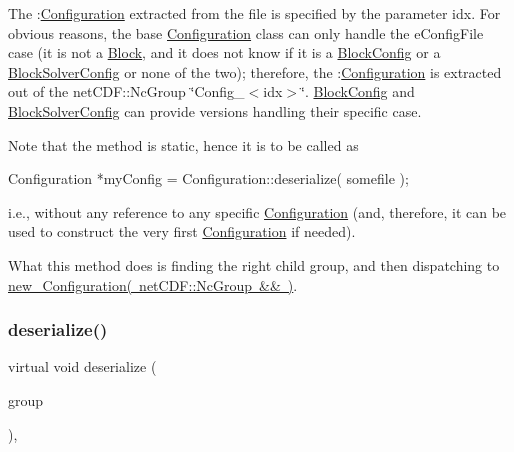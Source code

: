 The \+:\mbox{\hyperlink{class_s_m_spp__di__unipi__it_1_1_configuration}{Configuration}} extracted from the file is specified by the parameter idx. For obvious reasons, the base \mbox{\hyperlink{class_s_m_spp__di__unipi__it_1_1_configuration}{Configuration}} class can only handle the e\+Config\+File case (it is not a \mbox{\hyperlink{class_s_m_spp__di__unipi__it_1_1_block}{Block}}, and it does not know if it is a \mbox{\hyperlink{class_s_m_spp__di__unipi__it_1_1_block_config}{Block\+Config}} or a \mbox{\hyperlink{class_s_m_spp__di__unipi__it_1_1_block_solver_config}{Block\+Solver\+Config}} or none of the two); therefore, the \+:\mbox{\hyperlink{class_s_m_spp__di__unipi__it_1_1_configuration}{Configuration}} is extracted out of the net\+C\+D\+F\+::\+Nc\+Group \char`\"{}\+Config\+\_\+$<$idx$>$\char`\"{}. \mbox{\hyperlink{class_s_m_spp__di__unipi__it_1_1_block_config}{Block\+Config}} and \mbox{\hyperlink{class_s_m_spp__di__unipi__it_1_1_block_solver_config}{Block\+Solver\+Config}} can provide versions handling their specific case.

Note that the method is static, hence it is to be called as \begin{DoxyVerb}  Configuration *myConfig = Configuration::deserialize( somefile );
\end{DoxyVerb}


i.\+e., without any reference to any specific \mbox{\hyperlink{class_s_m_spp__di__unipi__it_1_1_configuration}{Configuration}} (and, therefore, it can be used to construct the very first \mbox{\hyperlink{class_s_m_spp__di__unipi__it_1_1_configuration}{Configuration}} if needed).

What this method does is finding the right child group, and then dispatching to \mbox{\hyperlink{class_s_m_spp__di__unipi__it_1_1_configuration_af3e786f9d33114595e17e3704a3b9a71}{new\+\_\+\+Configuration( net\+C\+D\+F\+::\+Nc\+Group \&\& )}}. \mbox{\label{class_s_m_spp__di__unipi__it_1_1_configuration_af03cd244e01fc59411ed4fcd6bd92949}} 
\subsubsection{\texorpdfstring{deserialize()}{deserialize()}\hspace{0.1cm}{\footnotesize\ttfamily [3/3]}}
{\footnotesize\ttfamily virtual void deserialize (\begin{DoxyParamCaption}\item[{net\+C\+D\+F\+::\+Nc\+Group \&\&}]{group }\end{DoxyParamCaption})\hspace{0.3cm}{\ttfamily [inline]}, {\ttfamily [virtual]}}



